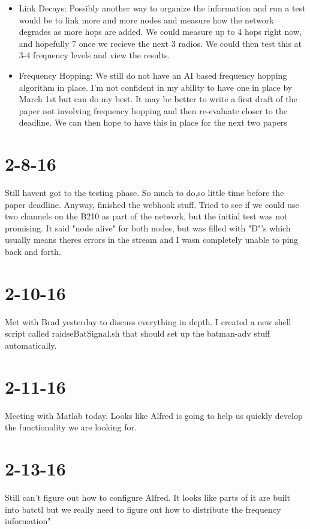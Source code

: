 \documentclass{article}
\begin{document}
{\begin{itemize}
		\item Link Decays: Possibly another way to organize the information and run a test
			would be to link more and more nodes and measure how the network
			degrades as more hops are added. We could measure up to 4 hops right now,
			and hopefully 7 once we recieve the next 3 radios. We could then
			test this at 3-4 frequency levels and view the results. 
		\item Frequency Hopping: We still do not have an AI based frequency hopping algorithm
			in place. I'm not confident in my ability to have one in place by March 1st
			but can do my best. It may be better to write a first draft of the paper
			not involving frequency hopping and then re-evaluate closer to the deadline.
			We can then hope to have this in place for the next two papers

	\end{itemize}

	\section{2-8-16}

	Still havent got to the testing phase. So much to do,so little time before the paper deadline. Anyway, finished the webhook stuff. Tried to see if we could
	use two channels on the B210 as part of the network, but the initial test was not promising. It said "node alive" for both nodes, but was filled with "D"'s which
	usually means theres errors in the stream and I wasn completely unable to ping back and forth. 
	\section{2-10-16}

	Met with Brad yesterday to discuss everything in depth. I created a new shell script called 
	raidseBatSignal.sh that should set up the batman-adv stuff automatically.
	\section{2-11-16} 

	Meeting with Matlab today. Looks like Alfred is going to help us quickly
	develop the functionality we are looking for.

	\section{2-13-16}

	Still can't figure out how to configure Alfred. It looks like parts of it are built into 
	batctl but we really need to figure out how to distribute the frequency information"

}
\end{document}
